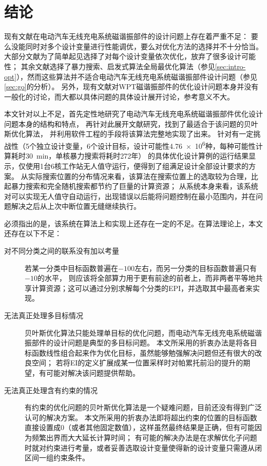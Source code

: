 \documentclass[index]{subfiles}
\begin{document}
\chapter{结论}\label{sec:con}
现有文献在电动汽车无线充电系统磁谐振部件的设计问题上存在着严重不足：
要么没能同时对多个设计变量进行性能调优，要么对优化方法的选择并不十分恰当。
大部分文献为了简单起见选择了对每个设计变量依次优化，放弃了很多设计可能性；
其余文献选择了暴力搜索、启发式算法全局最优化算法（参见\cref{sec:intro-opt}），然而这些算法并不适合电动汽车无线充电系统磁谐振部件设计问题（参见\cref{sec:go}的分析）。
另外，现有文献对WPT磁谐振部件的优化设计问题本身并没有一般化的讨论，而大都以具体问题的具体设计展开讨论，参考意义不大。

本文针对以上不足，首先定性地研究了电动汽车无线充电系统磁谐振部件优化设计问题本身的结构和特点，
再针对此展开文献研究，找到了最适合于该问题的贝叶斯优化算法，
并利用软件工程的手段将该算法完整地实现了出来。
针对有一定挑战性（5个独立设计变量，6个设计目标，设计可能性\num{4.76e6}种，每种可能性计算耗时\SI{30}{\minute}，单核暴力搜索将耗时\num{272}年）
的具体优化设计算例的运行结果显示，仅使用1台6核工作站无人值守运行\exmHour{}，便得到了\exmFea{}组满足设计全部设计要求的方案。
从实际搜索位置的分布情况来看，该算法在搜索位置上的选取较为合理，比起暴力搜索和完全随机搜索都节约了巨量的计算资源；
从系统本身来看，该系统对可以实现无人值守自动运行，出现错误以后能将问题控制在最小范围内，并在问题解决之后从上次中断位置无缝继续执行。

必须指出的是，该系统在算法上和实现上还存在一定的不足。在算法理论上，本文还存在以下不足：
\begin{description}
  \item[对不同分类之间的联系没有加以考量] 若某一分类中目标函数普遍在$-100$左右，而另一分类的目标函数普遍只有$-10$的水平，
  则应该将全部算力用于更有前途的前者上，而非两者平等地共享计算资源；这可以通过分别求解每个分类的EPI，并选取其中最高者来实现。
  \item[无法真正处理多目标情况] 贝叶斯优化算法只能处理单目标的优化问题，而电动汽车无线充电系统磁谐振部件的设计问题是典型的多目标问题。
  本文所采用的折衷办法是将各目标函数线性组合起来作为优化目标，虽然能够勉强解决问题但还有很大的改良空间；
  若将EI的定义扩展成某一位置采样时对帕累托前沿的提升的期望，有可能对解决该问题提供帮助。
  \item[无法真正处理含有约束的情况] 有约束的优化问题的贝叶斯优化算法是一个疑难问题，目前还没有得到广泛认可的解决方案。
  本文所采用的折衷办法即将超出约束的位置的目标函数直接设置成0（或者其他固定数值），这样虽然最终结果是正确，但有可能因为频繁出界而大大延长计算时间；
  有可能的解决办法是在求解优化子问题时就对约束进行考量，或者妥善选取设计变量使得新的设计变量只需遵从闭区间一组约束条件。
\end{description}
\end{document}
